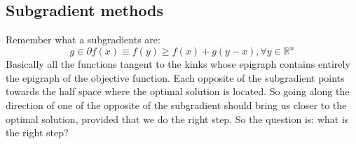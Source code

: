 \subsection{Subgradient methods}
\par Remember what a subgradients are:
\begin{equation}
    g \in \partial f(x) \equiv f(y) \geq f(x) + g(y - x), \forall y \in \mathbb{R}^n
\end{equation}
Basically all the functions tangent to the kinks whose epigraph contains entirely the epigraph of the objective function. Each opposite of the subgradient points towards the half space where the optimal solution is located. So going along the direction of one of the opposite of the subgradient should bring us closer to the optimal solution, provided that we do the right step. So the question is: what is the right step?


